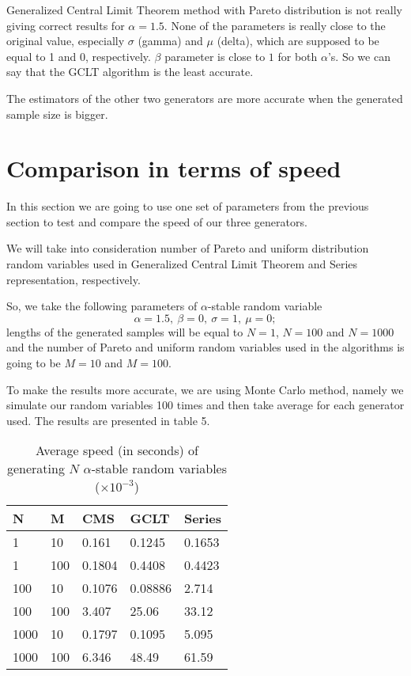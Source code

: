 \documentclass[12pt,titlepage]{article}
\begin{document}
Generalized Central Limit Theorem method with Pareto distribution is not really giving correct results for $\alpha=1.5$. None of the parameters is really close to the original value, especially $\sigma$ (gamma) and $\mu$ (delta), which are supposed to be equal to 1 and 0, respectively. $\beta$ parameter is close to $1$ for both $\alpha$'s. So we can say that the GCLT algorithm is the least accurate.

The estimators of the other two generators are more accurate when the generated sample size is bigger.



\section{Comparison in terms of speed}
In this section we are going to use one set of parameters from the previous section to test and compare the speed of our three generators.

We will take into consideration number of Pareto and uniform distribution random variables used in Generalized Central Limit Theorem and Series representation, respectively.

So, we take the following parameters of $\alpha$-stable random variable
\[\alpha=1.5,\ \beta=0,\ \sigma=1,\ \mu=0;\]
lengths of the generated samples will be equal to
$N=1$, $N=100$ and $N=1000$ and the number of Pareto and uniform random variables used in the algorithms is going to be $M=10$ and $M=100$.

To make the results more accurate, we are using Monte Carlo method, namely we simulate our random variables 100 times and then take average for each generator used. The results are presented in table 5.

\begin{table}[h]
\footnotesize
\centering
\caption{Average speed (in seconds) of generating $N$ $\alpha$-stable random variables ($\times 10^{-3} $) }
\begin{tabular}{ll|lll}
N     & M  & CMS   & GCLT    & Series         \\ \hline
1 & 10 & 0.161 &  0.1245  & 0.1653 \\
1 & 100 & 0.1804  & 0.4408  & 0.4423 \\
100 & 10 & 0.1076  & 0.08886  & 2.714 \\
100 & 100 & 3.407  & 25.06 &  33.12 \\
1000 & 10 & 0.1797  & 0.1095 &  5.095 \\
1000 & 100 & 6.346  & 48.49 &  61.59
\end{tabular}
\end{table}
\end{document}
